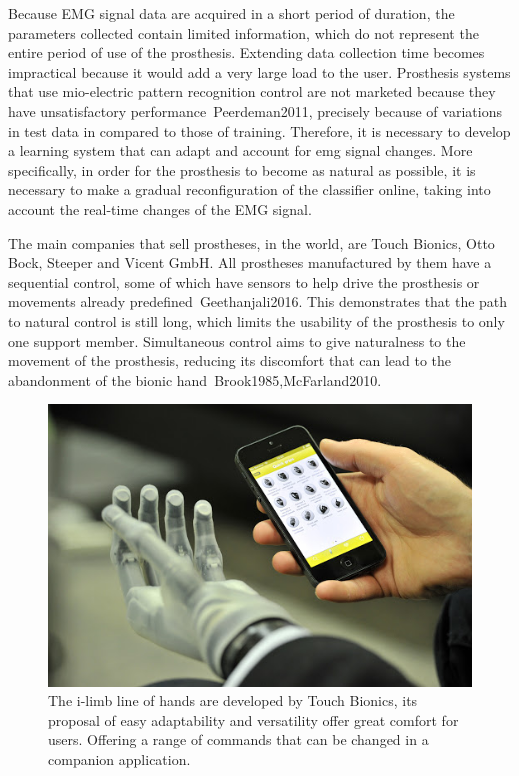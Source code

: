\documentclass[a4paper, 12pt]{ppgeb}
\begin{document}
Because \ac{EMG} signal data are acquired in a short period of duration, the parameters collected contain limited information, which do not represent the entire period of use of the prosthesis. Extending data collection time becomes impractical because it would add a very large load to the user. Prosthesis systems that use mio-electric pattern recognition control are not marketed because they have unsatisfactory performance~\cite{mainreferences}{Peerdeman2011}, precisely because of variations in test data in compared to those of training. Therefore, it is necessary to develop a learning system that can adapt and account for emg signal changes. More specifically, in order for the prosthesis to become as natural as possible, it is necessary to make a gradual reconfiguration of the classifier online, taking into account the real-time changes of the \ac{EMG} signal.

The main companies that sell prostheses, in the world, are Touch Bionics, Otto Bock, Steeper and Vicent GmbH. All prostheses manufactured by them have a sequential control, some of which have sensors to help drive the prosthesis or movements already predefined~\cite{mainreferences}{Geethanjali2016}. This demonstrates that the path to natural control is still long, which limits the usability of the prosthesis to only one support member. Simultaneous control aims to give naturalness to the movement of the prosthesis, reducing its discomfort that can lead to the abandonment of the bionic hand~\cite{mainreferences}{Brook1985,McFarland2010}.

\begin{figure}[h]
	\centering
	\includegraphics[width=.8\linewidth]{touch_bionics_prothesis.jpg}
	\caption{The i-limb line of hands are developed by Touch Bionics, its proposal of easy adaptability and versatility offer great comfort for users. Offering a range of commands that can be changed in a companion application.} \label{fig_prothesis}
\end{figure}
\end{document}
